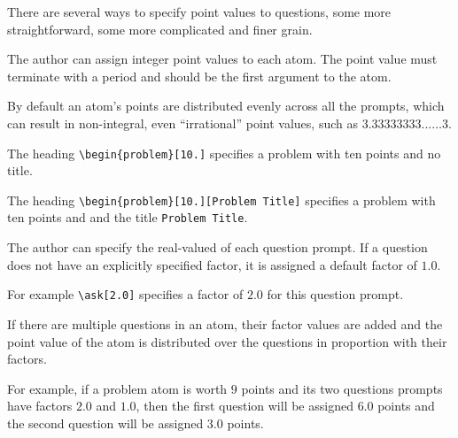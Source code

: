 \begin{cluster}
\label{grp:grm:quiz::point-values}

\begin{gram}
\label{grm:quiz::point-values}
There are several ways to specify point values to questions, some more
straightforward, some more complicated and finer grain.

The author can assign integer point values to each atom. 
The point value must terminate with a period and should be the first argument to the atom.

By default an atom's points are distributed evenly across all the
prompts, which can result in non-integral, even ``irrational'' point
values, such as $3.33333333...\ldots 3$.  

\end{gram}
\end{cluster}

\begin{cluster}
\label{grp:xmpl:quiz::heading}

\begin{example}
\label{xmpl:quiz::heading}
The heading
 \lstinline`\begin{problem}[10.]` specifies a problem with ten points
   and no title.

The heading
\lstinline`\begin{problem}[10.][Problem Title]` 
specifies a  problem with ten points and and the title
\lstinline`Problem Title`.

\end{example}
\end{cluster}

\begin{cluster}
\label{grp:grm:quiz::question-factors}

\begin{gram}
\label{grm:quiz::question-factors}
The author can specify the real-valued  of each question prompt.  
If a question does not have an explicitly specified factor, it is
assigned a default factor of $1.0$.

For example 
\lstinline`\ask[2.0]` 
specifies a factor of $2.0$ for this question prompt. 


If there are multiple questions in an atom, their factor values are
added and the point value of the atom is distributed over the
questions in proportion with their factors.

For example, if a problem atom is worth $9$ points and its two
questions prompts have factors $2.0$ and $1.0$, then the first
question will be assigned $6.0$ points and the second question will be
assigned $3.0$ points.

\end{gram}
\end{cluster}

